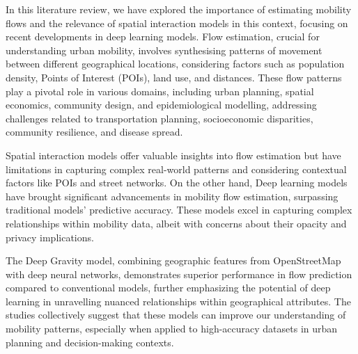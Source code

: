     In this literature review, we have explored the importance of estimating mobility flows and the relevance of spatial interaction models in this context, focusing on recent developments in deep learning models. Flow estimation, crucial for understanding urban mobility, involves synthesising patterns of movement between different geographical locations, considering factors such as population density, Points of Interest (POIs), land use, and distances. These flow patterns play a pivotal role in various domains, including urban planning, spatial economics, community design, and epidemiological modelling, addressing challenges related to transportation planning, socioeconomic disparities, community resilience, and disease spread.

    Spatial interaction models offer valuable insights into flow estimation but have limitations in capturing complex real-world patterns and considering contextual factors like POIs and street networks. On the other hand, Deep learning models have brought significant advancements in mobility flow estimation, surpassing traditional models' predictive accuracy. These models excel in capturing complex relationships within mobility data, albeit with concerns about their opacity and privacy implications.

    The Deep Gravity model, combining geographic features from OpenStreetMap with deep neural networks, demonstrates superior performance in flow prediction compared to conventional models, further emphasizing the potential of deep learning in unravelling nuanced relationships within geographical attributes. The studies collectively suggest that these models can improve our understanding of mobility patterns, especially when applied to high-accuracy datasets in urban planning and decision-making contexts.
